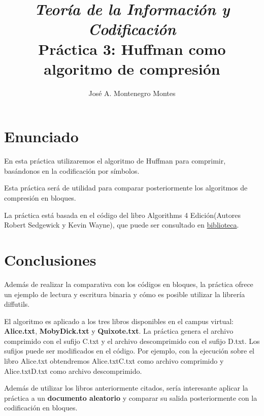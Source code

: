 \documentclass{article}
\begin{document}
\title{\textit{Teoría de la Información y Codificación}\\ \textbf{Práctica 3: Huffman como algoritmo de compresión}}
\author{José A. Montenegro Montes}

\maketitle


\section{Enunciado}

En esta práctica utilizaremos el algoritmo de Huffman para comprimir, basándonos en la codificación por símbolos.

Esta práctica será de utilidad para comparar posteriormente los algoritmos de compresión en bloques. 

La práctica está basada en el código del libro Algorithms 4 Edición(Autores Robert Sedgewick y Kevin Wayne), que puede ser consultado en \href{http://jabega.uma.es/search~S4*spi?/tAlgorithms/talgorithms/1%2C148%2C170%2CB/frameset&FF=talgorithms&4%2C%2C6#}{biblioteca}.



\section{Conclusiones}

Además de realizar la comparativa con los códigos en bloques, la práctica ofrece un ejemplo de lectura y escritura binaria y cómo es posible utilizar la librería diffutils.

El algoritmo es aplicado a los tres libros disponibles en el campus virtual: \textbf{Alice.txt}, \textbf{MobyDick.txt} y \textbf{Quixote.txt}. La práctica genera el archivo comprimido con el sufijo C.txt y el archivo descomprimido con el sufijo D.txt. Los sufijos puede ser modificados en el código. Por ejemplo, con la ejecución sobre el libro Alice.txt obtendremos Alice.txtC.txt como archivo comprimido y Alice.txtD.txt como archivo descomprimido.

Además de utilizar los libros anteriormente citados, sería interesante aplicar la práctica a un \textbf{documento aleatorio} y comparar su salida posteriormente con la codificación en bloques.
\end{document}
